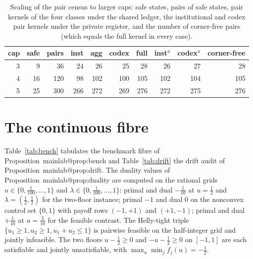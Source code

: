 \documentclass[11pt,a4paper]{article}
\makeatletter
\theoremstyle{plain}
\theoremstyle{definition}
\theoremstyle{remark}
\newcommand{\priv}{\pi}
\newcommand{\mref}[1]{\csname mainlab@#1\endcsname}
\makeatother
\begin{document}
\begin{table}[H]
\centering\small
\caption{Scaling of the pair census to larger caps: safe states, pairs of safe states, pair kernels of the four classes under the shared ledger, the institutional and codex pair kernels under the private register, and the number of corner-free pairs (which equals the full kernel in every case).}
\label{tab:family}
\begin{tabular}{rrrrrrrrrr}
\toprule
cap & safe & pairs & inst & agg & codex & full & inst$^{\priv}$ & codex$^{\priv}$ & corner-free \\
\midrule
3 & 9 & 36 & 24 & 26 & 25 & 28 & 26 & 27 & 28 \\
4 & 16 & 120 & 98 & 102 & 100 & 105 & 102 & 104 & 105 \\
5 & 25 & 300 & 266 & 272 & 269 & 276 & 272 & 275 & 276 \\
\bottomrule
\end{tabular}
\end{table}
\section{The continuous fibre}\label{si:continuous}

Table~\ref{tab:bench} tabulates the benchmark fibre of Proposition~\mref{prop:bench} and Table~\ref{tab:drift} the drift audit of Proposition~\mref{prop:drift}. The duality values of Proposition~\mref{prop:duality} are computed on the rational grids $u\in\{0,\tfrac1{100},\dots,1\}$ and $\lambda\in\{0,\tfrac1{100},\dots,1\}$: primal and dual $-\tfrac1{10}$ at $u=\tfrac12$ and $\lambda=(\tfrac12,\tfrac12)$ for the two-floor instance; primal $-1$ and dual $0$ on the nonconvex control set $\{0,1\}$ with payoff rows $(-1,+1)$ and $(+1,-1)$; primal and dual $+\tfrac1{10}$ at $u=\tfrac3{10}$ for the feasible contrast. The Helly-tight triple $\{u_1\ge 1,u_2\ge 1,u_1+u_2\le 1\}$ is pairwise feasible on the half-integer grid and jointly infeasible. The two floors $u-\tfrac12\ge 0$ and $-u-\tfrac12\ge 0$ on $[-1,1]$ are each satisfiable and jointly unsatisfiable, with $\max_u\min_j f_j(u)=-\tfrac12$.
\end{document}
